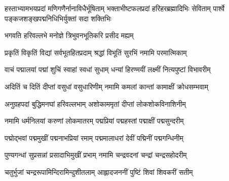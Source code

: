 
%
%
%
%
\begin{minipage}{\linewidth}
{हस्ताभ्यामभयप्रदां मणिगणैर्नानाविधैर्भूषिताम्}
{भक्ताभीष्टफलप्रदां हरिहरब्रह्मादिभिः सेविताम्}
{पार्श्वे पङ्कजशङ्खपद्मनिधिभिर्युक्तां सदा शक्तिभिः}
\end{minipage}

{भगवति हरिवल्लभे मनोज्ञे त्रिभुवनभूतिकरि प्रसीद मह्यम्}

\resetShloka
\twolineshloka
{प्रकृतिं विकृतिं विद्यां सर्वभूतहितप्रदाम्}
{श्रद्धां विभूतिं सुरभिं नमामि परमात्मिकाम्}

\twolineshloka
{वाचं पद्मालयां पद्मां शुचिं स्वाहां स्वधां सुधाम्}
{धन्यां हिरण्मयीं लक्ष्मीं नित्यपुष्टां विभावरीम्}

\twolineshloka
{अदितिं च दितिं दीप्तां वसुधां वसुधारिणीम्}
{नमामि कमलां कान्तां कामाक्षीं क्रोधसम्भवाम्}

\twolineshloka
{अनुग्रहपदां बुद्धिमनघां हरिवल्लभाम्}
{अशोकाममृतां दीप्तां लोकशोकविनाशिनीम्}

\twolineshloka
{नमामि धर्मनिलयां करुणां लोकमातरम्}
{पद्मप्रियां पद्महस्तां पद्माक्षीं पद्मसुन्दरीम्}

\twolineshloka
{पद्मोद्भवां पद्ममुखीं पद्मनाभप्रियां रमाम्}
{पद्ममालाधरां देवीं पद्मिनीं पद्मगन्धिनीम्}

\twolineshloka
{पुण्यगन्धां सुप्रसन्नां प्रसादाभिमुखीं प्रभाम्}
{नमामि चन्द्रवदनां चन्द्रां चन्द्रसहोदरीम्}

\twolineshloka
{चतुर्भुजां चन्द्ररूपामिन्दिरामिन्दुशीतलाम्}
{आह्लादजननीं पुष्टिं शिवां शिवकरीं सतीम्}

